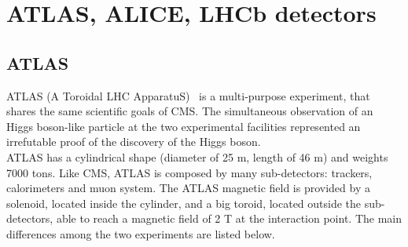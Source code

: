 




\section{ATLAS, ALICE, LHCb detectors}

\subsection{ATLAS}
ATLAS (A Toroidal LHC ApparatuS)~\cite{Aad:2008zzm} is a multi-purpose experiment, that shares the same scientific goals of CMS. The simultaneous observation of an Higgs boson-like particle at the two experimental facilities represented an irrefutable proof of the discovery of the Higgs boson.\\
ATLAS has a cylindrical shape (diameter of 25 m, length of 46 m) and weights 7000 tons. Like CMS, ATLAS is composed by many sub-detectors: trackers, calorimeters and muon system. The ATLAS magnetic field is provided by a solenoid, located inside the cylinder, and a big toroid, located outside the sub-detectors, able to reach a magnetic field of 2 T at the interaction point. The main differences among the two experiments are listed below.

